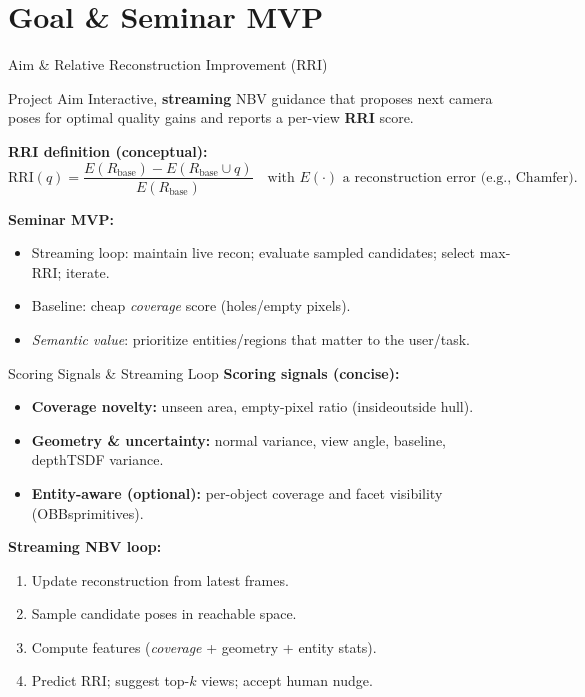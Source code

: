 \documentclass[10pt,aspectratio=169]{beamer}
\begin{document}
\section{Goal \& Seminar MVP}

\begin{frame}{Aim \& Relative Reconstruction Improvement (RRI)}
\begin{block}{Project Aim}
Interactive, \textbf{streaming} NBV guidance that proposes next camera poses for optimal quality gains and reports a per-view \textbf{RRI} score.
\end{block}

\textbf{RRI definition (conceptual):}
\begin{equation*}
\mathrm{RRI}(q)=\frac{E(R_{\text{base}})-E(R_{\text{base}}\cup q)}{E(R_{\text{base}})} \quad
\text{with } E(\cdot) \text{ a reconstruction error (e.g., Chamfer).}
\end{equation*}

\textbf{Seminar MVP:}
\begin{itemize}
  \item Streaming loop: maintain live recon; evaluate sampled candidates; select max-RRI; iterate.
  \item Baseline: cheap \textit{coverage} score (holes/empty pixels).
  \item \textit{Semantic value}: prioritize entities/regions that matter to the user/task.
\end{itemize}
\end{frame}

\begin{frame}{Scoring Signals \& Streaming Loop}
\textbf{Scoring signals (concise):}
\begin{itemize}
  \item \textbf{Coverage \/ novelty:} unseen area, empty-pixel ratio (inside\/outside hull).
  \item \textbf{Geometry \& uncertainty:} normal variance, view angle, baseline, depth\/TSDF variance.
  \item \textbf{Entity-aware (optional):} per-object coverage and facet visibility (OBBs\/primitives).
\end{itemize}

\textbf{Streaming NBV loop:}
\begin{enumerate}
  \item Update reconstruction from latest frames.
  \item Sample candidate poses in reachable space.
  \item Compute features (\textit{coverage} + geometry + entity stats).
  \item Predict RRI; suggest top-$k$ views; accept human nudge.
\end{enumerate}
\end{frame}
\end{document}
